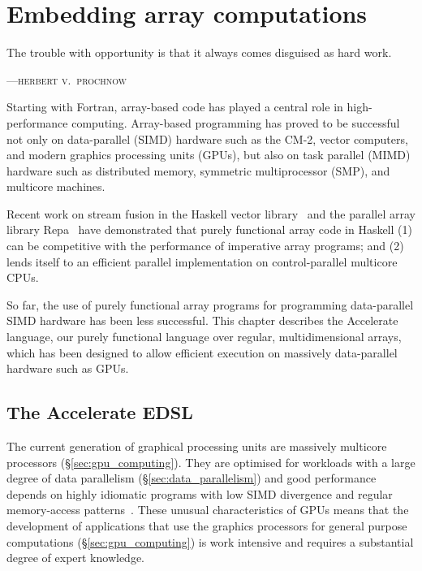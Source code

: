 %

\chapter{Embedding array computations}
\label{ch:accelerate}

\epigraph{The trouble with opportunity is that it always comes disguised as hard work.}%
{\textsc{---herbert v.\ prochnow}}


Starting with Fortran, array-based code has played a central role in
high-performance computing. Array-based programming has proved to be successful
not only on data-parallel (SIMD) hardware such as the CM-2, vector computers,
and modern graphics processing units (GPUs\gpu{}), but also on task parallel
(MIMD) hardware such as distributed memory, symmetric multiprocessor (SMP), and
multicore machines.

Recent work on stream fusion in the Haskell vector
library~\cite{Coutts:2007kp,Mainland:2013ez} and the parallel array library
Repa~\cite{Keller:2010er,Lippmeier:2011cd,Lippmeier:2012gx} have demonstrated
that purely functional array code in Haskell (1) can be competitive with the
performance of imperative array programs; and (2) lends itself to an efficient
parallel implementation on control-parallel multicore CPUs.

So far, the use of purely functional array programs for programming
data-parallel SIMD hardware has been less successful. This chapter describes the
Accelerate language, our purely functional language over regular,
multidimensional arrays, which has been designed to allow efficient execution on
massively data-parallel hardware such as GPUs.


\section{The Accelerate EDSL}
\label{sec:accelerate}

The current generation of graphical processing units are massively multicore
processors (\S\ref{sec:gpu_computing}). They are optimised for workloads with a
large degree of data parallelism (\S\ref{sec:data_parallelism}) and good
performance depends on highly idiomatic programs with low SIMD divergence and
regular memory-access patterns~\cite{NVIDIA:2012wf}. These unusual
characteristics of GPUs means that the development of applications that use the
graphics processors for general purpose computations (\S\ref{sec:gpu_computing})
is work intensive and requires a substantial degree of expert knowledge.

